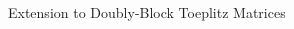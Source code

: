 \begin{frame}{Extension to Doubly-Block Toeplitz Matrices}
  \vspace{0.5cm}
  \begin{overlayarea}{\textwidth}{2.8cm}
    \centering
  \end{overlayarea}

\end{frame}




